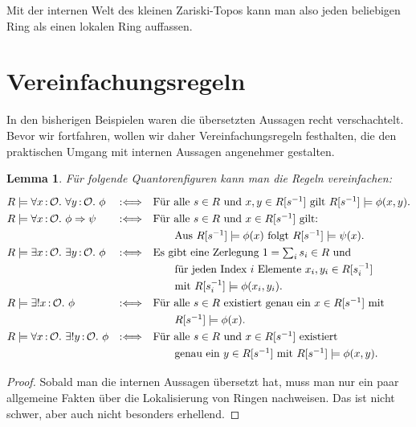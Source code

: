 \documentclass[a4paper,ngerman,12pt]{scrartcl}
\theoremstyle{definition}
\theoremstyle{plain}
\newtheorem{lemma}[defn]{Lemma}
\theoremstyle{remark}
\renewcommand{\O}{\mathcal{O}}
\renewcommand{\_}{\mathpunct{.}\,}
\newcommand{\?}{\,{:}\,}
\begin{document}
Mit der internen Welt des kleinen Zariski-Topos kann man also jeden
beliebigen Ring als einen lokalen Ring auffassen.


\section{Vereinfachungsregeln}

In den bisherigen Beispielen waren die übersetzten Aussagen recht
verschachtelt. Bevor wir fortfahren, wollen wir daher
Vereinfachungsregeln festhalten, die den praktischen Umgang mit internen
Aussagen angenehmer gestalten.

\begin{lemma}\label{vereinfachung}%
Für folgende Quantorenfiguren kann man die Regeln vereinfachen:
\[\renewcommand{\arraystretch}{1.3}\begin{array}{@{}lcl@{}}
  R \models \forall x\?\O\_ \forall y\?\O\_ \phi &\Ll&
    \text{Für alle~$s \in R$ und~$x,y \in R[s^{-1}]$ gilt~$R[s^{-1}] \models
    \phi(x,y)$.} \\
  R \models \forall x\?\O\_ \phi \Rightarrow \psi &\Ll&
    \text{Für alle~$s \in R$ und~$x \in R[s^{-1}]$ gilt:} \\
  &&{\quad\quad} \text{Aus $R[s^{-1}] \models \phi(x)$ folgt $R[s^{-1}] \models \psi(x)$.} \\
  R \models \exists x\?\O\_ \exists y\?\O\_ \phi &\Ll&
    \text{Es gibt eine Zerlegung~$1 = \sum_i s_i \in R$ und} \\
  &&{\quad\quad} \text{für jeden Index~$i$ Elemente~$x_i, y_i \in R[s_i^{-1}]$} \\
  &&{\quad\quad} \text{mit $R[s_i^{-1}] \models \phi(x_i,y_i)$.} \\
  R \models \exists!x \? \O\_ \phi &\Ll&
    \text{Für alle~$s \in R$ existiert genau ein~$x \in R[s^{-1}]$ mit} \\
  &&{\quad\quad} R[s^{-1}] \models \phi(x). \\
  R \models \forall x\?\O\_ \exists! y\?\O\_ \phi &\Ll&
    \text{Für alle~$s \in R$ und~$x \in R[s^{-1}]$ existiert} \\
  &&{\quad\quad} \text{genau ein~$y \in R[s^{-1}]$ mit $R[s^{-1}] \models
  \phi(x,y)$.}
\end{array}\]
\end{lemma}
\begin{proof}Sobald man die internen Aussagen übersetzt hat, muss man nur ein
paar allgemeine Fakten über die Lokalisierung von Ringen nachweisen. Das ist
nicht schwer, aber auch nicht besonders erhellend.\end{proof}
\end{document}
